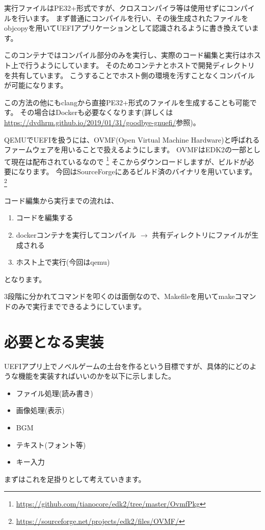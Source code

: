 \documentclass[10pt, b5paper, openany]{ltjsbook}
\begin{document}
実行ファイルはPE32+形式ですが、クロスコンパイラ等は使用せずにコンパイルを行います。
まず普通にコンパイルを行い、その後生成されたファイルをobjcopyを用いてUEFIアプリケーションとして認識されるように書き換えています。

このコンテナではコンパイル部分のみを実行し、実際のコード編集と実行はホスト上で行うようにしています。
そのためコンテナとホストで開発ディレクトリを共有しています。
こうすることでホスト側の環境を汚すことなくコンパイルが可能になります。

この方法の他にもclangから直接PE32+形式のファイルを生成することも可能です。
その場合はDockerも必要なくなります(詳しくは\url{https://dvdhrm.github.io/2019/01/31/goodbye-gnuefi/}参照)。

QEMUでUEFIを扱うには、OVMF(Open Virtual Machine Hardware)と呼ばれるファームウェアを用いることで扱えるようにします。
OVMFはEDK2の一部として現在は配布されているなので
\footnote{\url{https://github.com/tianocore/edk2/tree/master/OvmfPkg}}
そこからダウンロードしますが、ビルドが必要になります。
今回はSourceForgeにあるビルド済のバイナリを用いています。
\footnote{\url{https://sourceforge.net/projects/edk2/files/OVMF/}}

コード編集から実行までの流れは、
\begin{enumerate}
    \item コードを編集する
    \item dockerコンテナを実行してコンパイル $\rightarrow$ 共有ディレクトリにファイルが生成される
    \item ホスト上で実行(今回はqemu)
\end{enumerate}
となります。

3段階に分かれてコマンドを叩くのは面倒なので、Makefileを用いてmakeコマンドのみで実行までできるようにしています。

\chapter{必要となる実装}
UEFIアプリ上でノベルゲームの土台を作るという目標ですが、具体的にどのような機能を実装すればいいのかを以下に示しました。
\begin{itemize}
    \item ファイル処理(読み書き)
    \item 画像処理(表示)
    \item BGM
    \item テキスト(フォント等)
    \item キー入力
\end{itemize}
まずはこれを足掛りとして考えていきます。
\end{document}
